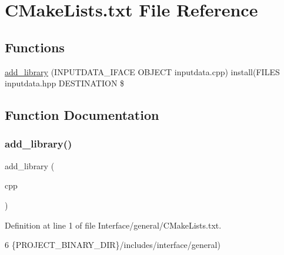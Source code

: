 \hypertarget{Interface_2general_2CMakeLists_8txt}{}\section{C\+Make\+Lists.\+txt File Reference}
\label{Interface_2general_2CMakeLists_8txt}
\subsection*{Functions}
\begin{DoxyCompactItemize}
\item 
\hyperlink{Interface_2general_2CMakeLists_8txt_ae87af35893ece3f93aecc739dd8f1085}{add\+\_\+library} (I\+N\+P\+U\+T\+D\+A\+T\+A\+\_\+\+I\+F\+A\+CE O\+B\+J\+E\+CT inputdata.\+cpp) install(F\+I\+L\+ES inputdata.\+hpp D\+E\+S\+T\+I\+N\+A\+T\+I\+ON \$
\end{DoxyCompactItemize}


\subsection{Function Documentation}
\mbox{\label{Interface_2general_2CMakeLists_8txt_ae87af35893ece3f93aecc739dd8f1085}} 
\subsubsection{\texorpdfstring{add\+\_\+library()}{add\_library()}}
{\footnotesize\ttfamily add\+\_\+library (\begin{DoxyParamCaption}\item[{I\+N\+P\+U\+T\+D\+A\+T\+A\+\_\+\+I\+F\+A\+CE O\+B\+J\+E\+CT inputdata.}]{cpp }\end{DoxyParamCaption})}



Definition at line 1 of file Interface/general/\+C\+Make\+Lists.\+txt.


\begin{DoxyCode}
6                \{PROJECT\_BINARY\_DIR\}/includes/interface/general)
\end{DoxyCode}
